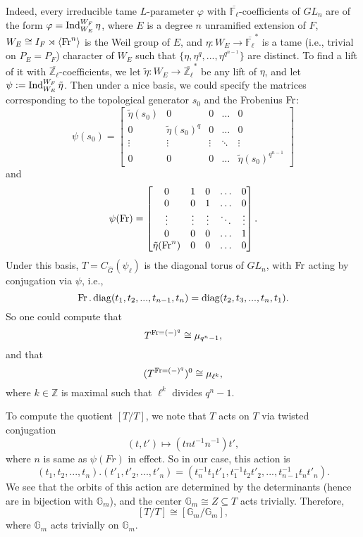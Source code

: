 Indeed, every irreducible tame $L$-parameter $\varphi$ with $\overline{\mathbb{F}_{\ell}}$-coefficients of $GL_n$ are of the form $\varphi=\operatorname{\operatorname{Ind}}_{W_E}^{W_F}\eta$, where $E$ is a degree $n$ unramified extension of $F$, $W_E \cong I_F \rtimes \left<\operatorname{Fr}^n\right>$ is the Weil group of $E$, and $\eta: W_E \to \overline{\mathbb{F}_{\ell}}^*$ is a tame (i.e., trivial on $P_E=P_F$) character of $W_E$ such that $\{\eta, \eta^q, ..., \eta^{q^{n-1}}\}$ are distinct. To find a lift of it with $\overline{\mathbb{Z}_{\ell}}$-coefficients, we let $\tilde{\eta}: W_E \to \overline{\mathbb{Z}_{\ell}}^*$ be any lift of $\eta$, and let $\psi:=\operatorname{\operatorname{Ind}}_{W_E}^{W_F}\tilde{\eta}$. Then under a nice basis, we could specify the matrices corresponding to the topological generator $s_0$ and the Frobenius $\operatorname{Fr}$:
$$\psi(s_0)=
\begin{bmatrix}\label{Matrices}
	\tilde{\eta}(s_0) & 0                   & 0      & \dots  & 0 \\
	0                 & \tilde{\eta}(s_0)^q & 0      & \dots  & 0 \\
	\vdots            & \vdots              & \vdots & \ddots & \vdots \\
	0                 & 0                   & 0      & \dots   & \tilde{\eta}(s_0)^{q^{n-1}}
\end{bmatrix}$$
and 
$$\psi(\operatorname{Fr})=
\begin{bmatrix}
	0                   & 1      & 0      & \dots  & 0 \\
	0                   & 0      & 1      & \dots  & 0 \\
	\vdots              & \vdots & \vdots & \ddots & \vdots \\
	0                   & 0      & 0      & \dots  & 1 \\
	\tilde{\eta}(\operatorname{Fr}^n) & 0      & 0      & \dots  & 0
\end{bmatrix}
.$$
Under this basis, $T=C_{\hat{G}}(\psi_{\ell})$ is the diagonal torus of $GL_n$, with $\operatorname{Fr}$ acting by conjugation via $\psi$, i.e., 
$$\operatorname{Fr}. \operatorname{\operatorname{diag}}(t_1, t_2, ..., t_{n-1}, t_{n}) = \operatorname{\operatorname{diag}}(t_{2}, t_{3}, ..., t_{n}, t_{1}).$$
So one could compute that 
$$T^{\operatorname{Fr}=(-)^q}\cong \mu_{q^n-1},$$
and that
$$(T^{\operatorname{Fr}=(-)^q})^0 \cong \mu_{\ell^k},$$
where $k \in \mathbb{Z}$ is maximal such that $\ell^k$ divides $q^n-1$.

To compute the quotient $[T/T]$, we note that $T$ acts on $T$ via twisted conjugation
$$(t, t') \mapsto (tnt^{-1}n^{-1})t',$$
where $n$ is same as $\psi(Fr)$ in effect. So in our case, this action is 
$$(t_1, t_2, ..., t_n).(t'_1, t'_2, ..., t'_n)=(t_n^{-1}t_1t'_1, t_1^{-1}t_2t'_2, ..., t_{n-1}^{-1}t_nt'_n).$$ 
We see that the orbits of this action are determined by the determinants (hence are in bijection with $\mathbb{G}_m$), and the center $\mathbb{G}_m \cong Z \subseteq T$ acts trivially. Therefore,
$$[T/T] \cong [\mathbb{G}_m/\mathbb{G}_m],$$
where $\mathbb{G}_m$ acts trivially on $\mathbb{G}_m$.

